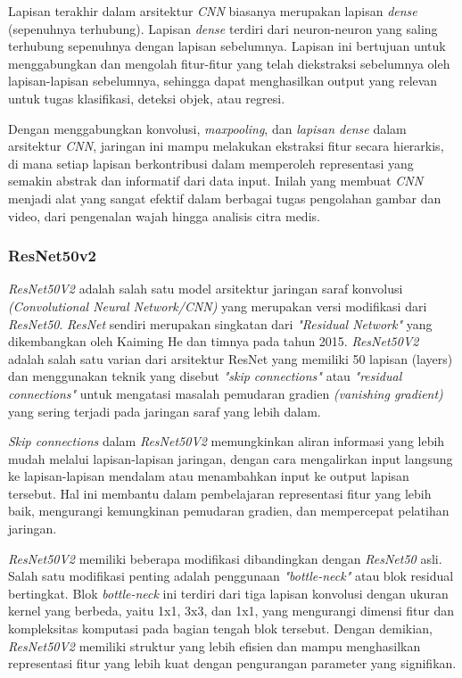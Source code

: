 Lapisan terakhir dalam arsitektur \textit{CNN} biasanya merupakan lapisan \textit{dense} (sepenuhnya terhubung). Lapisan \textit{dense} terdiri dari neuron-neuron yang saling terhubung sepenuhnya dengan lapisan sebelumnya. Lapisan ini bertujuan untuk menggabungkan dan mengolah fitur-fitur yang telah diekstraksi sebelumnya oleh lapisan-lapisan sebelumnya, sehingga dapat menghasilkan output yang relevan untuk tugas klasifikasi, deteksi objek, atau regresi.

Dengan menggabungkan konvolusi, \textit{maxpooling}, dan \textit{lapisan dense} dalam arsitektur \textit{CNN}, jaringan ini mampu melakukan ekstraksi fitur secara hierarkis, di mana setiap lapisan berkontribusi dalam memperoleh representasi yang semakin abstrak dan informatif dari data input. Inilah yang membuat \textit{CNN} menjadi alat yang sangat efektif dalam berbagai tugas pengolahan gambar dan video, dari pengenalan wajah hingga analisis citra medis.

\subsubsection{ResNet50v2}
\textit{ResNet50V2} adalah salah satu model arsitektur jaringan saraf konvolusi \textit{(Convolutional Neural Network/CNN)} yang merupakan versi modifikasi dari \textit{ResNet50}. \textit{ResNet} sendiri merupakan singkatan dari \textit{"Residual Network"} yang dikembangkan oleh Kaiming He dan timnya pada tahun 2015. \textit{ResNet50V2} adalah salah satu varian dari arsitektur ResNet yang memiliki 50 lapisan (layers) dan menggunakan teknik yang disebut \textit{"skip connections"} atau \textit{"residual connections"} untuk mengatasi masalah pemudaran gradien \textit{(vanishing gradient)} yang sering terjadi pada jaringan saraf yang lebih dalam. \cite{rahimzadeh2020modified}

\textit{Skip connections} dalam \textit{ResNet50V2} memungkinkan aliran informasi yang lebih mudah melalui lapisan-lapisan jaringan, dengan cara mengalirkan input langsung ke lapisan-lapisan mendalam atau menambahkan input ke output lapisan tersebut. Hal ini membantu dalam pembelajaran representasi fitur yang lebih baik, mengurangi kemungkinan pemudaran gradien, dan mempercepat pelatihan jaringan.

\textit{ResNet50V2} memiliki beberapa modifikasi dibandingkan dengan \textit{ResNet50} asli. Salah satu modifikasi penting adalah penggunaan \textit{"bottle-neck"} atau blok residual bertingkat. Blok \textit{bottle-neck} ini terdiri dari tiga lapisan konvolusi dengan ukuran kernel yang berbeda, yaitu 1x1, 3x3, dan 1x1, yang mengurangi dimensi fitur dan kompleksitas komputasi pada bagian tengah blok tersebut. Dengan demikian, \textit{ResNet50V2} memiliki struktur yang lebih efisien dan mampu menghasilkan representasi fitur yang lebih kuat dengan pengurangan parameter yang signifikan.

